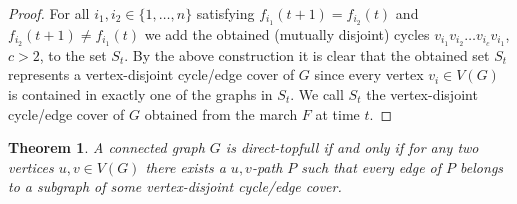 \documentclass{article}
\newtheorem{theorem}{Theorem}[section]
\begin{document}
\begin{proof}
    For all $i_1,i_2 \in \{1,\ldots, n\}$ satisfying $f_{i_1}(t+1)=f_{i_2}(t)$ and $f_{i_2}(t+1)\neq f_{i_1}(t)$ we add the obtained (mutually disjoint) cycles $v_{i_1}v_{i_2}\ldots v_{i_c}v_{i_1}$, $c>2$, to the set $S_t$. By the above construction it is clear that the obtained set $S_t$ represents a vertex-disjoint cycle/edge cover of $G$ since every vertex $v_i\in V(G)$ is contained in exactly one of the graphs in $S_t$. We call $S_t$ the vertex-disjoint cycle/edge cover of $G$ obtained from the march $F$ at time $t$.
\end{proof}

\begin{theorem}\label{thm:direct-topfull}
    A connected graph $G$ is direct-topfull if and only if for any two vertices $u,v
    \in V(G)$ there exists a $u,v$-path $P$ such that every edge of $P$ belongs to a subgraph of some vertex-disjoint cycle/edge cover.
\end{theorem}
\end{document}
